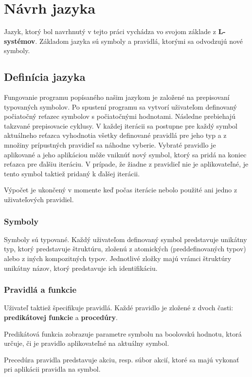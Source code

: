 \chapter{Návrh jazyka}

Jazyk, ktorý bol navrhnutý v tejto práci vychádza vo svojom základe z \textbf{L-systémov}.
Základom jazyka sú symboly a pravidlá, ktorými sa odvodzujú nové symboly.


\section{Definícia jazyka}
Fungovanie programu popísaného našim jazykom je založené na prepisovaní typovaných symbolov.
Po spustení programu sa vytvorí uživateľom definovaný počiatočný reťazec symbolov s počiatočnými hodnotami.
Následne prebiehajú takzvané prepisovacie cyklusy. V každej iterácii sa postupne pre každý symbol aktuálneho reťazca
vyhodnotia všetky definované pravidlá pre jeho typ a z množiny prípustných pravidieľ sa náhodne vyberie.
Vybraté pravidlo je aplikované a jeho aplikáciou môže vniknúť nový symbol, ktorý sa pridá na koniec reťazca pre ďalšiu iteráciu.
V prípade, že žiadne z pravidieľ nie je aplikovateľné, je tento symbol taktiež pridaný k ďalšej iterácii.

Výpočet je ukončený v momente keď počas iterácie nebolo použité ani jedno z uživateľových pravidiel.

\subsection{Symboly}
Symboly sú typované. Každý uživateľom definovaný symbol predstavuje unikátny typ, ktorý predstavuje štruktúru, zloženú z atomických (preddefinovaných typov) alebo
z iných kompozitných typov. Jednotlivé zložky majú vrámci štruktúry unikátny názov, ktorý predstavuje ich identifikáciu.

\subsection{Pravidlá a funkcie}
Uživateľ taktiež špecifikuje pravidlá. Každé pravidlo je zložené z dvoch časti: \textbf{predikátovej funkcie} a \textbf{procedúry}.

Predikátová funkcia zobrazuje parametre symbolu na boolovskú hodnotu, ktorá určuje, či je pravidlo aplikovateľné na
aktuálny symbol. 

Precedúra pravidla predstavuje akciu, resp. súbor akcií, ktoré sa majú vykonať pri aplikácii pravidla na symbol. 


